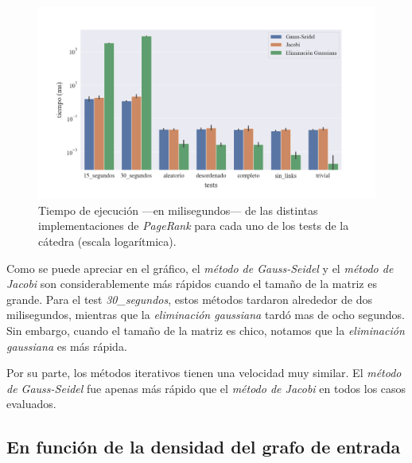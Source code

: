 \begin{figure}[!htbp]
    \centering
    \includegraphics[width=1\textwidth, trim=0 0 0 30]{files/src/.media/tiempo-ejecucion.png}
    \caption{Tiempo de ejecución ---en milisegundos--- de las distintas implementaciones de \textit{PageRank} para cada uno de los tests de la cátedra (escala logarítmica).} \label{tiempo_ej}
\end{figure}


\vspace{1em}
Como se puede apreciar en el gráfico, el \textit{método de Gauss-Seidel} y el \textit{método de Jacobi} son considerablemente más rápidos cuando el tamaño de la matriz es grande. Para el test \textit{30\_segundos}, estos métodos tardaron alrededor de dos milisegundos, mientras que la \textit{eliminación gaussiana} tardó mas de ocho segundos. Sin embargo, cuando el tamaño de la matriz es chico, notamos que la \textit{eliminación gaussiana} es más rápida. 

Por su parte, los métodos iterativos tienen una velocidad muy similar. El \textit{método de Gauss-Seidel} fue apenas más rápido que el \textit{método de Jacobi} en todos los casos evaluados.


\vspace{2em}
\subsection{En función de la densidad del grafo de entrada}
